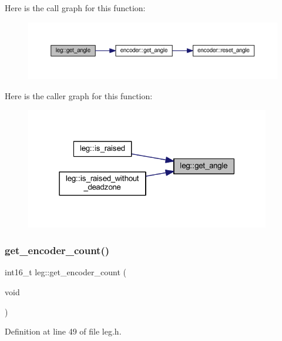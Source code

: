 Here is the call graph for this function\+:
\nopagebreak
\begin{figure}[H]
\begin{center}
\leavevmode
\includegraphics[width=350pt]{classleg_a0f98905721d2f20536b7dc908597263e_cgraph}
\end{center}
\end{figure}
Here is the caller graph for this function\+:
\nopagebreak
\begin{figure}[H]
\begin{center}
\leavevmode
\includegraphics[width=303pt]{classleg_a0f98905721d2f20536b7dc908597263e_icgraph}
\end{center}
\end{figure}
\mbox{\label{classleg_ab7d470db701c7745266338157b79e1d0}} 
\subsubsection{\texorpdfstring{get\_encoder\_count()}{get\_encoder\_count()}}
{\footnotesize\ttfamily int16\+\_\+t leg\+::get\+\_\+encoder\+\_\+count (\begin{DoxyParamCaption}\item[{void}]{ }\end{DoxyParamCaption})\hspace{0.3cm}{\ttfamily [inline]}}



Definition at line 49 of file leg.\+h.


